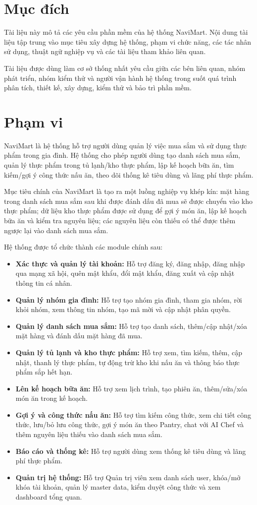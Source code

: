 \section{Mục đích}
Tài liệu này mô tả các yêu cầu phần mềm của hệ thống NaviMart. Nội dung tài liệu tập trung vào mục tiêu xây dựng hệ thống, phạm vi chức năng, các tác nhân sử dụng, thuật ngữ nghiệp vụ và các tài liệu tham khảo liên quan.

Tài liệu được dùng làm cơ sở thống nhất yêu cầu giữa các bên liên quan, nhóm phát triển, nhóm kiểm thử và người vận hành hệ thống trong suốt quá trình phân tích, thiết kế, xây dựng, kiểm thử và bảo trì phần mềm.

\section{Phạm vi}
NaviMart là hệ thống hỗ trợ người dùng quản lý việc mua sắm và sử dụng thực phẩm trong gia đình. Hệ thống cho phép người dùng tạo danh sách mua sắm, quản lý thực phẩm trong tủ lạnh/kho thực phẩm, lập kế hoạch bữa ăn, tìm kiếm/gợi ý công thức nấu ăn, theo dõi thống kê tiêu dùng và lãng phí thực phẩm.

Mục tiêu chính của NaviMart là tạo ra một luồng nghiệp vụ khép kín: mặt hàng trong danh sách mua sắm sau khi được đánh dấu đã mua sẽ được chuyển vào kho thực phẩm; dữ liệu kho thực phẩm được sử dụng để gợi ý món ăn, lập kế hoạch bữa ăn và kiểm tra nguyên liệu; các nguyên liệu còn thiếu có thể được thêm ngược lại vào danh sách mua sắm.

Hệ thống được tổ chức thành các module chính sau:
\begin{itemize}
    \item \textbf{Xác thực và quản lý tài khoản:} Hỗ trợ đăng ký, đăng nhập, đăng nhập qua mạng xã hội, quên mật khẩu, đổi mật khẩu, đăng xuất và cập nhật thông tin cá nhân.
    \item \textbf{Quản lý nhóm gia đình:} Hỗ trợ tạo nhóm gia đình, tham gia nhóm, rời khỏi nhóm, xem thông tin nhóm, tạo mã mời và cập nhật phân quyền.
    \item \textbf{Quản lý danh sách mua sắm:} Hỗ trợ tạo danh sách, thêm/cập nhật/xóa mặt hàng và đánh dấu mặt hàng đã mua.
    \item \textbf{Quản lý tủ lạnh và kho thực phẩm:} Hỗ trợ xem, tìm kiếm, thêm, cập nhật, thanh lý thực phẩm, tự động trừ kho khi nấu ăn và thông báo thực phẩm sắp hết hạn.
    \item \textbf{Lên kế hoạch bữa ăn:} Hỗ trợ xem lịch trình, tạo phiên ăn, thêm/sửa/xóa món ăn trong kế hoạch.
    \item \textbf{Gợi ý và công thức nấu ăn:} Hỗ trợ tìm kiếm công thức, xem chi tiết công thức, lưu/bỏ lưu công thức, gợi ý món ăn theo Pantry, chat với AI Chef và thêm nguyên liệu thiếu vào danh sách mua sắm.
    \item \textbf{Báo cáo và thống kê:} Hỗ trợ người dùng xem thống kê tiêu dùng và lãng phí thực phẩm.
    \item \textbf{Quản trị hệ thống:} Hỗ trợ Quản trị viên xem danh sách user, khóa/mở khóa tài khoản, quản lý master data, kiểm duyệt công thức và xem dashboard tổng quan.
\end{itemize}

